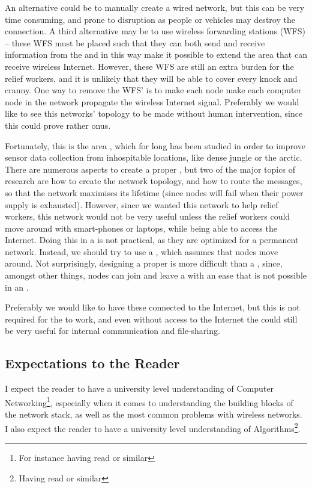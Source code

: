 An alternative could be to manually create a wired network, but this can be very time consuming, and prone to disruption as people or vehicles may destroy the connection. A third alternative may be to use wireless forwarding stations (WFS) -- these WFS must be placed such that they can both send and receive information from the \wbs and in this way  make it possible to extend the area that can receive wireless Internet. However, these WFS are still an extra burden for the relief workers, and it is unlikely that they will be able to cover every knock and cranny. One way to remove the WFS' is to make each node make each computer node in the network propagate the wireless Internet signal. Preferably we would like to see this networks' topology to be made without human intervention, since this could prove rather onus. 

Fortunately, this is the area \anet, which for long has been studied in order to improve sensor data collection from inhospitable locations, like dense jungle or the arctic. There are numerous aspects to create a proper \anet, but two of the major topics of research are how to create the network topology, and how to route the messages, so that the network maximises its lifetime (since nodes will fail when their power supply is exhausted). However, since we wanted this network to help relief workers, this network would not be very useful unless the relief workers could move around with smart-phones or laptops, while being able to access the Internet. Doing this in a \anet is not practical, as they are optimized for a permanent network. Instead, we should try to use a \manet, which assumes that nodes move around. Not surprisingly, designing a proper \manet is more difficult than a \anet, since, amongst other things, nodes can join and leave a \manet with an ease that is not possible in an \anet.  

Preferably we would like to have these \manet connected to the Internet, but this is not required for the \manet to work, and even without access to the Internet the \manet could still  be very useful for internal communication and file-sharing. 
 

\subsection{Expectations to the Reader}
I expect the reader to have a university level understanding of Computer Networking\footnote{For instance having read \cite{ComNet} or similar}, especially when it comes to understanding the building blocks of the network stack, as well as the most common problems with wireless networks. I also expect the reader to have a university level understanding of Algorithms\footnote{Having read \cite{algo} or similar}. 

